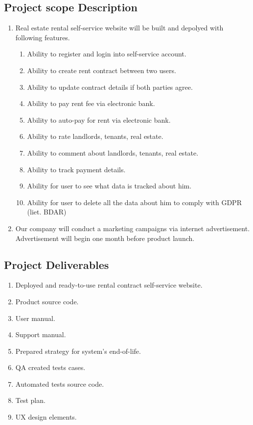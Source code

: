 \documentclass{VUMIFPSkursinis}
\begin{document}
	\subsection{Project scope Description}
		\begin{enumerate}
			\item{Real estate rental self-service website will be built and depolyed with following features.}
				\begin{enumerate}
					\item{Ability to register and login into self-service account.}
					\item{Ability to create rent contract between two users.}
					\item{Ability to update contract details if both parties agree.}
					\item{Ability to pay rent fee via electronic bank.}
					\item{Ability to auto-pay for rent via electronic bank.}
					\item{Ability to rate landlords, tenants, real estate.}
					\item{Ability to comment about landlords, tenants, real estate.}
					\item{Ability to track payment details.}
					\item{Ability for user to see what data is tracked about him.}
					\item{Ability for user to delete all the data about him to comply with GDPR (liet. BDAR)}
				\end{enumerate}
			\item{Our company will conduct a marketing campaigns via internet advertisement. Advertisement will begin one month before product launch.}
		\end{enumerate}

	\subsection{Project Deliverables}
		\begin{enumerate}
			\item{Deployed and ready-to-use rental contract self-service website.}
			\item{Product source code.}
			\item{User manual.}
			\item{Support manual.}
			\item{Prepared strategy for system's end-of-life.}
			\item{QA created tests cases.}
			\item{Automated tests source code.}
			\item{Test plan.}
			\item{UX design elements.}
		\end{enumerate}
\end{document}
